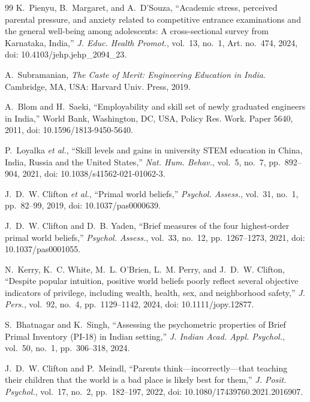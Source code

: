 \documentclass[journal,a4paper]{IEEEtran}
\begin{document}
\begin{thebibliography}{99}
\providecommand{\url}[1]{#1}
K.~Pienyu, B.~Margaret, and A.~D'Souza, ``Academic stress, perceived parental pressure, and anxiety related to competitive entrance examinations and the general well-being among adolescents: A cross-sectional survey from Karnataka, India,'' \emph{J. Educ. Health Promot.}, vol.~13, no.~1, Art. no.~474, 2024, doi: 10.4103/jehp.jehp\_2094\_23.

A.~Subramanian, \emph{The Caste of Merit: Engineering Education in India}. Cambridge, MA, USA: Harvard Univ. Press, 2019.

A.~Blom and H.~Saeki, ``Employability and skill set of newly graduated engineers in India,'' World Bank, Washington, DC, USA, Policy Res. Work. Paper 5640, 2011, doi: 10.1596/1813-9450-5640.

P.~Loyalka \emph{et al.}, ``Skill levels and gains in university STEM education in China, India, Russia and the United States,'' \emph{Nat. Hum. Behav.}, vol.~5, no.~7, pp.~892--904, 2021, doi: 10.1038/s41562-021-01062-3.

J.~D.~W. Clifton \emph{et al.}, ``Primal world beliefs,'' \emph{Psychol. Assess.}, vol.~31, no.~1, pp.~82--99, 2019, doi: 10.1037/pas0000639.

J.~D.~W. Clifton and D.~B. Yaden, ``Brief measures of the four highest-order primal world beliefs,'' \emph{Psychol. Assess.}, vol.~33, no.~12, pp.~1267--1273, 2021, doi: 10.1037/pas0001055.

N.~Kerry, K.~C. White, M.~L. O'Brien, L.~M. Perry, and J.~D.~W. Clifton, ``Despite popular intuition, positive world beliefs poorly reflect several objective indicators of privilege, including wealth, health, sex, and neighborhood safety,'' \emph{J. Pers.}, vol.~92, no.~4, pp.~1129--1142, 2024, doi: 10.1111/jopy.12877.

S.~Bhatnagar and K.~Singh, ``Assessing the psychometric properties of Brief Primal Inventory (PI-18) in Indian setting,'' \emph{J. Indian Acad. Appl. Psychol.}, vol.~50, no.~1, pp.~306--318, 2024.

J.~D.~W. Clifton and P.~Meindl, ``Parents think---incorrectly---that teaching their children that the world is a bad place is likely best for them,'' \emph{J. Posit. Psychol.}, vol.~17, no.~2, pp.~182--197, 2022, doi: 10.1080/17439760.2021.2016907.


\end{thebibliography}
\end{document}
